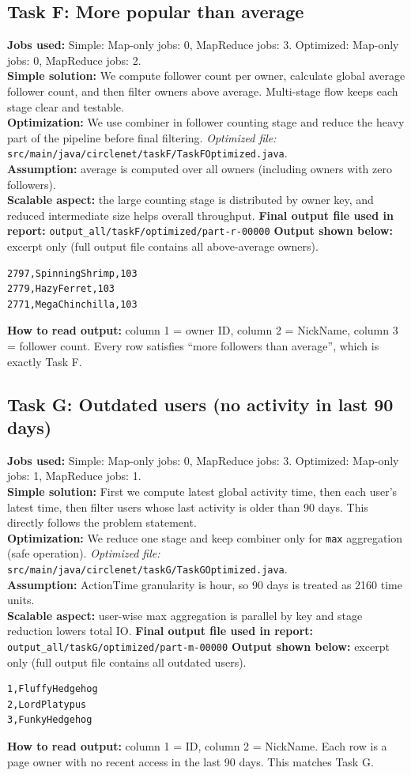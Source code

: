 \documentclass[11pt]{article}
\begin{document}
\subsection*{Task F: More popular than average}
\textbf{Jobs used:} Simple: Map-only jobs: 0, MapReduce jobs: 3. Optimized: Map-only jobs: 0, MapReduce jobs: 2.\\
\textbf{Simple solution:} We compute follower count per owner, calculate global average follower count, and then filter owners above average. Multi-stage flow keeps each stage clear and testable.\\
\textbf{Optimization:} We use combiner in follower counting stage and reduce the heavy part of the pipeline before final filtering. \textit{Optimized file:} \texttt{src/main/java/circlenet/taskF/TaskFOptimized.java}.\\
\textbf{Assumption:} average is computed over all owners (including owners with zero followers).\\
\textbf{Scalable aspect:} the large counting stage is distributed by owner key, and reduced intermediate size helps overall throughput.
\textbf{Final output file used in report:} \texttt{output\_all/taskF/optimized/part-r-00000}
\textbf{Output shown below:} excerpt only (full output file contains all above-average owners).
\begin{lstlisting}
2797,SpinningShrimp,103
2779,HazyFerret,103
2771,MegaChinchilla,103
\end{lstlisting}
\textbf{How to read output:} column 1 = owner ID, column 2 = NickName, column 3 = follower count. Every row satisfies ``more followers than average'', which is exactly Task F.

\subsection*{Task G: Outdated users (no activity in last 90 days)}
\textbf{Jobs used:} Simple: Map-only jobs: 0, MapReduce jobs: 3. Optimized: Map-only jobs: 1, MapReduce jobs: 1.\\
\textbf{Simple solution:} First we compute latest global activity time, then each user's latest time, then filter users whose last activity is older than 90 days. This directly follows the problem statement.\\
\textbf{Optimization:} We reduce one stage and keep combiner only for \texttt{max} aggregation (safe operation). \textit{Optimized file:} \texttt{src/main/java/circlenet/taskG/TaskGOptimized.java}.\\
\textbf{Assumption:} ActionTime granularity is hour, so 90 days is treated as 2160 time units.\\
\textbf{Scalable aspect:} user-wise max aggregation is parallel by key and stage reduction lowers total IO.
\textbf{Final output file used in report:} \texttt{output\_all/taskG/optimized/part-m-00000}
\textbf{Output shown below:} excerpt only (full output file contains all outdated users).
\begin{lstlisting}
1,FluffyHedgehog
2,LordPlatypus
3,FunkyHedgehog
\end{lstlisting}
\textbf{How to read output:} column 1 = ID, column 2 = NickName. Each row is a page owner with no recent access in the last 90 days. This matches Task G.
\end{document}
